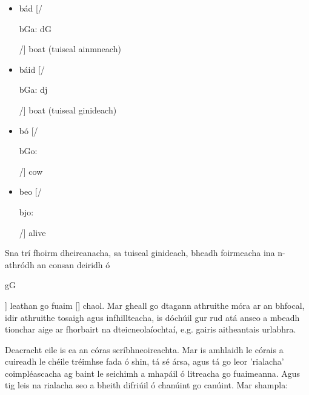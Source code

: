 \begin{multicols}{2}
\begin{itemize}
\item bád    [/\begin{IPA}b\super Ga: d\super G\end{IPA}/]  boat  (tuiseal ainmneach)
\item báid   [/\begin{IPA}b\super Ga: d\super j\end{IPA}/]  boat  (tuiseal ginideach)
\end{itemize}

\begin{itemize}
\item bó [/\begin{IPA}b\super Go: \end{IPA}/] cow 
\item beo [/\begin{IPA}b\super jo: \end{IPA}/] alive  
\end{itemize}  

Sna trí fhoirm dheireanacha, sa tuiseal ginideach, bheadh foirmeacha ina n-athródh an consan deiridh ó \begin{IPA}g\super G\end{IPA}] leathan go fuaim [] chaol. Mar gheall go dtagann athruithe móra ar an bhfocal, idir athruithe tosaigh agus infhillteacha, is dóchúil gur rud atá anseo a mbeadh tionchar aige ar fhorbairt na dteicneolaíochtaí, e.g. gairis aitheantais urlabhra. 


Deacracht eile is ea an córas scríbhneoireachta. Mar is amhlaidh le córais a cuireadh le chéile tréimhse fada ó shin, tá sé ársa, agus tá go leor 'rialacha’ coimpléascacha ag baint le seichimh a mhapáil ó litreacha go fuaimeanna. Agus tig leis na rialacha seo a bheith difriúil ó chanúint go canúint. Mar shampla:


\end{multicols}

